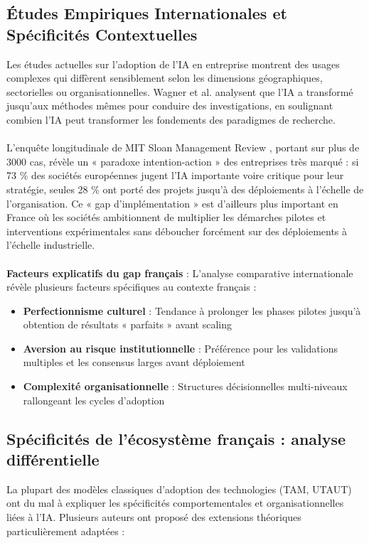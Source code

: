\subsection{Études Empiriques Internationales et Spécificités Contextuelles}

Les études actuelles sur l’adoption de l’IA en entreprise montrent des usages complexes qui diffèrent sensiblement selon les dimensions géographiques, sectorielles ou organisationnelles. Wagner et al. \cite{wagner2022artificial} analysent que l’IA a transformé jusqu’aux méthodes mêmes pour conduire des investigations, en soulignant combien l’IA peut transformer les fondements des paradigmes de recherche.
\\\\
L’enquête longitudinale de MIT Sloan Management Review \cite{ransbotham2023expanding}, portant sur plus de 3000 cas, révèle un « paradoxe intention-action » des entreprises très marqué : si 73 \% des sociétés européennes jugent l’IA importante voire critique pour leur stratégie, seules 28 \% ont porté des projets jusqu’à des déploiements à l’échelle de l’organisation. Ce « gap d’implémentation » est d’ailleurs plus important en France où les sociétés ambitionnent de multiplier les démarches pilotes et interventions expérimentales sans déboucher forcément sur des déploiements à l’échelle industrielle.
\\\\
\textbf{Facteurs explicatifs du gap français} : L'analyse comparative internationale révèle plusieurs facteurs spécifiques au contexte français :
\begin{itemize}
    \item \textbf{Perfectionnisme culturel} : Tendance à prolonger les phases pilotes jusqu'à obtention de résultats « parfaits » avant scaling
    \item \textbf{Aversion au risque institutionnelle} : Préférence pour les validations multiples et les consensus larges avant déploiement
    \item \textbf{Complexité organisationnelle} : Structures décisionnelles multi-niveaux rallongeant les cycles d'adoption
\end{itemize}

\subsection{Spécificités de l'écosystème français : analyse différentielle}

La plupart des modèles classiques d’adoption des technologies (TAM, UTAUT) ont du mal à expliquer les spécificités comportementales et organisationnelles liées à l’IA. Plusieurs auteurs ont proposé des extensions théoriques particulièrement adaptées :

